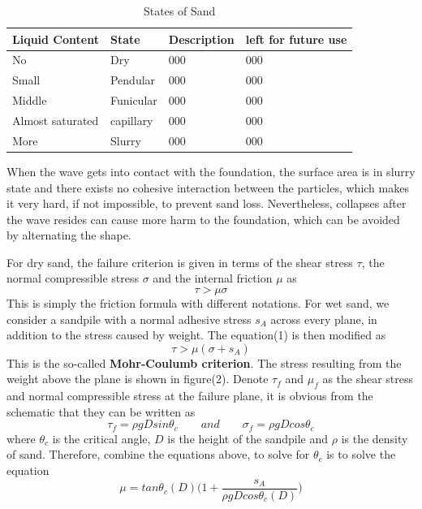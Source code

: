 \documentclass[12pt]{article}
\begin{document}
\begin{table}[H]
	\caption{States of Sand}
	\vspace{10pt}
	\centering
	\begin{tabular}{p{4cm}p{2cm}p{4cm}p{4cm}}
		\hline
		Liquid Content & State & Description & left for future use \\
		\hline
		No  			  & Dry   	    & 000          & 000                    \\
		Small  			  & Pendular    & 000     	   & 000                        \\
		Middle  		  & Funicular   & 000    	   & 000                        \\
		Almost saturated  & capillary & 000          & 000                        \\
		More  			  & Slurry      & 000          & 000                        \\  
		\hline       
	\end{tabular}
	\label{bs2}
\end{table}
\par
When the wave gets into contact with the foundation, the surface area is in slurry state and there exists no cohesive interaction between the particles, which makes it very hard, if not impossible, to prevent sand loss. Nevertheless, collapses after the wave resides can cause more harm to the foundation, which can be avoided by alternating the shape.
\par 
For dry sand, the failure criterion is given in terms of the shear stress $\tau$, the normal compressible stress $\sigma$ and the internal friction $\mu$ as
$$\tau > \mu\sigma$$
This is simply the friction formula with different notations. For wet sand, we consider a sandpile with a normal adhesive stress $s_A$ across every plane, in addition to the stress caused by weight. The equation(1) is then modified as
$$\tau > \mu(\sigma + s_A)$$
This is the so-called \textbf{Mohr-Coulumb criterion}. The stress resulting from the weight above the plane is shown in figure(2). Denote $\tau_f$ and $\mu_f$ as the shear stress and normal compressible stress at the failure plane, it is obvious from the schematic that they can be written as
$$\tau_f = \rho gDsin\theta_c \qquad and \qquad \sigma_f = \rho gDcos\theta_c$$
where $\theta_c$ is the critical angle, $D$ is the height of the sandpile and $\rho$ is the density of sand. Therefore, combine the equations above, to solve for $\theta_c$ is to solve the equation
$$\mu = tan\theta_c(D)\bigg(1 + \frac{s_A}{\rho gDcos\theta_c(D)}\bigg)$$
\par
\end{document}
